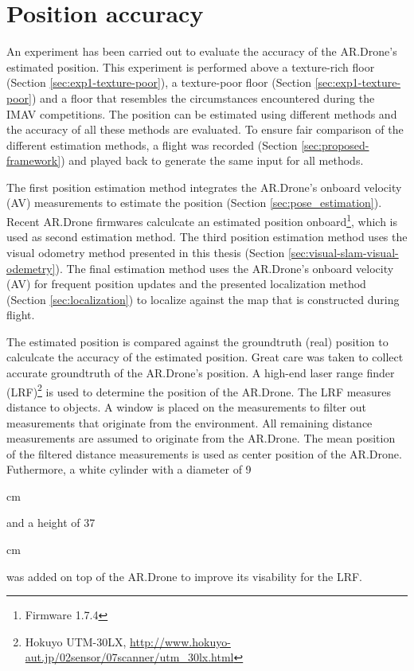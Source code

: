 \section{Position accuracy}
\label{sec:results-position-accuracy}
An experiment has been carried out to evaluate the accuracy of the AR.Drone's estimated position.
This experiment is performed above a texture-rich floor (Section \ref{sec:exp1-texture-poor}), a texture-poor floor (Section \ref{sec:exp1-texture-poor}) and a floor that resembles the circumstances encountered during the IMAV competitions.
The position can be estimated using different methods and the accuracy of all these methods are evaluated.
To ensure fair comparison of the different estimation methods, a flight was recorded (Section \ref{sec:proposed-framework}) and played back to generate the same input for all methods.

The first position estimation method integrates the AR.Drone's onboard velocity (AV) measurements to estimate the position (Section \ref{sec:pose_estimation}).
Recent AR.Drone firmwares calculcate an estimated position onboard\footnote{Firmware 1.7.4}, which is used as second estimation method.
The third position estimation method uses the visual odometry method presented in this thesis (Section \ref{sec:visual-slam-visual-odemetry}).
The final estimation method uses the AR.Drone's onboard velocity (AV) for frequent position updates and the presented localization method (Section \ref{sec:localization}) to localize against the map that is constructed during flight.

The estimated position is compared against the groundtruth (real) position to calculcate the accuracy of the estimated position.
Great care was taken to collect accurate groundtruth of the AR.Drone's position.
A high-end laser range finder (LRF)\footnote{Hokuyo UTM-30LX, \url{http://www.hokuyo-aut.jp/02sensor/07scanner/utm_30lx.html}} is used to determine the position of the AR.Drone.
The LRF measures distance to objects.
A window is placed on the measurements to filter out measurements that originate from the environment.
All remaining distance measurements are assumed to originate from the AR.Drone.
The mean position of the filtered distance measurements is used as center position of the AR.Drone.
Futhermore, a white cylinder with a diameter of 9\begin{small}cm\end{small} and a height of 37\begin{small}cm\end{small} was added on top of the AR.Drone to improve its visability for the LRF.

